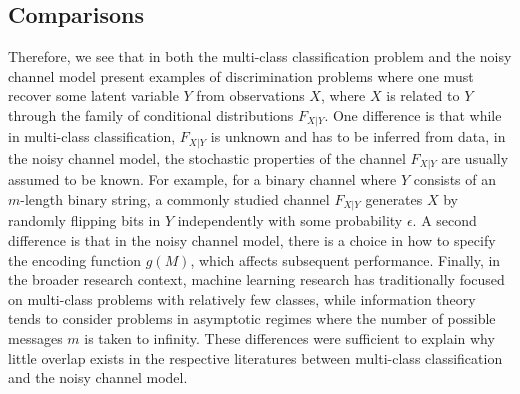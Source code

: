 \subsection{Comparisons}

Therefore, we see that in both the multi-class classification problem
and the noisy channel model present examples of discrimination
problems where one must recover some latent variable $Y$ from
observations $X$, where $X$ is related to $Y$ through the family of
conditional distributions $F_{X|Y}$.  One difference is that while in
multi-class classification, $F_{X|Y}$ is unknown and has to be
inferred from data, in the noisy channel model, the stochastic
properties of the channel $F_{X|Y}$ are usually assumed to be known.
For example, for a binary channel where $Y$ consists of an $m$-length
binary string, a commonly studied channel $F_{X|Y}$ generates $X$ by
randomly flipping bits in $Y$ independently with some probability
$\epsilon$.  A second difference is that in the noisy channel model,
there is a choice in how to specify the encoding function $g(M)$,
which affects subsequent performance.  Finally, in the broader
research context, machine learning research has traditionally focused
on multi-class problems with relatively few classes, while information
theory tends to consider problems in asymptotic regimes where the
number of possible messages $m$ is taken to infinity. These
differences were sufficient to explain why little overlap exists in
the respective literatures between multi-class classification and the
noisy channel model.  


